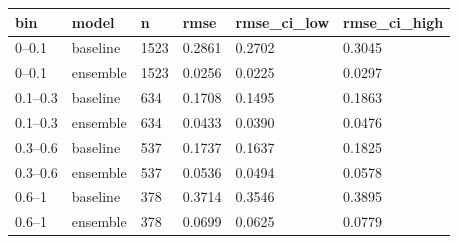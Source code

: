 \begin{tabular}{llllll}
\toprule
bin & model & n & rmse & rmse\_ci\_low & rmse\_ci\_high \\
\midrule
0–0.1 & baseline & 1523 & 0.2861 & 0.2702 & 0.3045 \\
0–0.1 & ensemble & 1523 & 0.0256 & 0.0225 & 0.0297 \\
0.1–0.3 & baseline & 634 & 0.1708 & 0.1495 & 0.1863 \\
0.1–0.3 & ensemble & 634 & 0.0433 & 0.0390 & 0.0476 \\
0.3–0.6 & baseline & 537 & 0.1737 & 0.1637 & 0.1825 \\
0.3–0.6 & ensemble & 537 & 0.0536 & 0.0494 & 0.0578 \\
0.6–1 & baseline & 378 & 0.3714 & 0.3546 & 0.3895 \\
0.6–1 & ensemble & 378 & 0.0699 & 0.0625 & 0.0779 \\
\bottomrule
\end{tabular}
